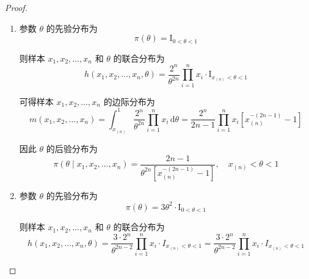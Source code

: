 \documentclass[normal,founder,mtpro2,cn]{elegantnote}
\begin{document}
\begin{enumerate}
\begin{proof}
            \begin{enumerate}
                \item
                      参数 $\theta$ 的先验分布为
                      \begin{equation*}
                          \pi(\theta)=\mathrm{I}_{0<\theta<1}
                      \end{equation*}

                      则样本 $x_{1},x_{2},\ldots,x_{n}$ 和 $\theta$ 的联合分布为
                      \begin{equation*}
                          h\left(x_{1},x_{2},\ldots,x_{n},\theta\right)=\frac{2^{n}}{\theta^{2n}}\prod_{i=1}^{n}x_{i}\cdot\mathrm{I}_{x_{(n)}<\theta<1}
                      \end{equation*}

                      可得样本 $x_{1},x_{2},\ldots,x_{n}$ 的边际分布为
                      \begin{equation*}
                          m\left(x_{1},x_{2},\ldots,x_{n}\right)=\int_{x_{(n)}}^{1}\frac{2^{n}}{\theta^{2n}}\prod_{i=1}^{n}x_{i}\,\mathrm{d}\theta=\frac{2^{n}}{2n-1}\prod_{i=1}^{n}x_{i}\left[x_{(n)}^{-(2n-1)}-1\right]
                      \end{equation*}

                      因此 $\theta$ 的后验分布为
                      \begin{equation*}
                          \pi\left(\theta\mid x_{1},x_{2},\ldots,x_{n}\right)=\frac{2n-1}{\theta^{2n}\left[x_{(n)}^{-(2n-1)}-1\right]},\quad x_{(n)}<\theta<1
                      \end{equation*}
                \item
                      参数 $\theta$ 的先验分布为
                      \begin{equation*}
                          \pi(\theta)=3\theta^{2}\cdot\mathrm{I}_{0<\theta<1}
                      \end{equation*}

                      则样本 $x_{1},x_{2},\ldots,x_{n}$ 和 $\theta$ 的联合分布为
                      \begin{equation*}
                          h\left(x_{1},x_{2},\ldots,x_{n},\theta\right)=\frac{3\cdot 2^{n}}{\theta^{2n-2}}\prod_{i=1}^{n}x_{i}\cdot I_{x_{(n)}<\theta<1}=\frac{3\cdot 2^{n}}{\theta^{2n-2}}\prod_{i=1}^{n}x_{i}\cdot I_{x_{(n)}<\theta<1}
                      \end{equation*}


\end{enumerate}
\end{proof}
\end{enumerate}
\end{document}

